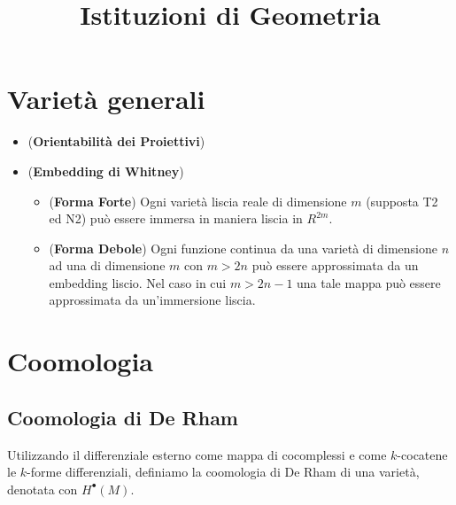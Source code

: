 \documentclass[a4paper,NoNotes,GeneralMath]{stdmdoc}
\begin{document}
\title{Istituzioni di Geometria}

\section{Varietà generali}
\begin{itemize}
\item ({\bf Orientabilità dei Proiettivi})
\item ({\bf Embedding di Whitney})
  \begin{itemize}
  \item ({\bf Forma Forte}) Ogni varietà liscia reale di dimensione $m$ (supposta T2 ed N2) può essere immersa in maniera liscia in $R^{2m}$.
  \item ({\bf Forma Debole}) Ogni funzione continua da una varietà di dimensione $n$ ad una di dimensione $m$ con $m > 2n$ può essere approssimata da un embedding liscio. Nel caso in cui $m > 2n - 1$ una tale mappa può essere approssimata da un'immersione liscia.
  \end{itemize}
\end{itemize}

\section{Coomologia}
\subsection{Coomologia di De Rham}
Utilizzando il differenziale esterno come mappa di cocomplessi e come $k$-cocatene le $k$-forme differenziali, definiamo la coomologia di De Rham di una varietà, denotata con $H^\bullet (M)$.
\end{document}
